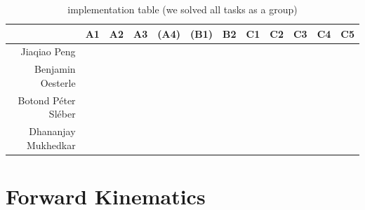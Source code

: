 \documentclass[a4paper,10pt]{article}
\begin{document}
\begin{table}[h!]
  \begin{center}
    \begin{tabular}{rccccccccccc}
               ~          & \textbf{A1} & \textbf{A2} & \textbf{A3} & \textbf{(A4)} & \textbf{(B1)} & \textbf{B2} & \textbf{C1} & \textbf{C2} & \textbf{C3} & \textbf{C4} & \textbf{C5}\\\hline
      Jiaqiao Peng        &      ~      &      ~      &      ~      &       ~       &       ~       &      ~      &      ~      &      ~      &      ~      &      ~      &      ~     \\\hline
      Benjamin Oesterle   &      ~      &      ~      &      ~      &       ~       &       ~       &      ~      &      ~      &      ~      &      ~      &      ~      &      ~     \\\hline
      Botond Péter Sléber &      ~      &      ~      &      ~      &       ~       &       ~       &      ~      &      ~      &      ~      &      ~      &      ~      &      ~     \\\hline
      Dhananjay Mukhedkar &      ~      &      ~      &      ~      &       ~       &       ~       &      ~      &      ~      &      ~      &      ~      &      ~      &      ~     \\\hline
      
    \end{tabular}
    \caption{implementation table (we solved all tasks as a group)}
  \end{center}
\end{table}

\newpage

\section{Forward Kinematics}
\end{document}
